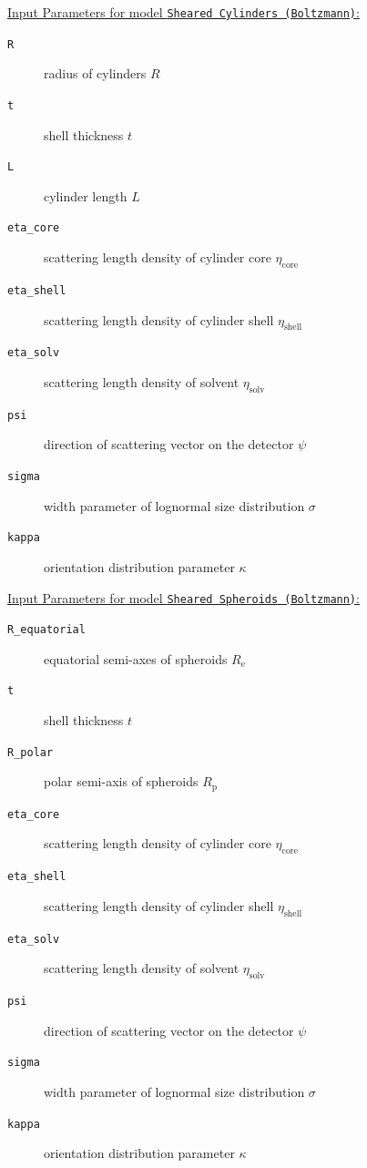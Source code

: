 \vspace{5mm}

\underline{Input Parameters for model \texttt{Sheared Cylinders (Boltzmann)}:}\\
\begin{description}
\item[\texttt{R}] radius of cylinders $R$
\item[\texttt{t}] shell thickness $t$
\item[\texttt{L}] cylinder length $L$
\item[\texttt{eta\_core}] scattering length density of cylinder core $\eta_\mathrm{core}$
\item[\texttt{eta\_shell}] scattering length density of cylinder shell $\eta_\mathrm{shell}$
\item[\texttt{eta\_solv}] scattering length density of solvent $\eta_\mathrm{solv}$
\item[\texttt{psi}] direction of scattering vector on the detector $\psi$
\item[{\texttt{sigma}}] width parameter of lognormal size distribution $\sigma$
\item[{\texttt{kappa}}] orientation distribution parameter $\kappa$
\end{description}

\vspace{5mm}

\underline{Input Parameters for model \texttt{Sheared Spheroids (Boltzmann)}:}\\
\begin{description}
\item[\texttt{R\_equatorial}] equatorial semi-axes of spheroids $R_\mathrm{e}$
\item[\texttt{t}] shell thickness $t$
\item[\texttt{R\_polar}] polar semi-axis of spheroids $R_\mathrm{p}$
\item[\texttt{eta\_core}] scattering length density of cylinder core $\eta_\mathrm{core}$
\item[\texttt{eta\_shell}] scattering length density of cylinder shell $\eta_\mathrm{shell}$
\item[\texttt{eta\_solv}] scattering length density of solvent $\eta_\mathrm{solv}$
\item[\texttt{psi}] direction of scattering vector on the detector $\psi$
\item[{\texttt{sigma}}] width parameter of lognormal size distribution $\sigma$
\item[{\texttt{kappa}}] orientation distribution parameter $\kappa$
\end{description}

